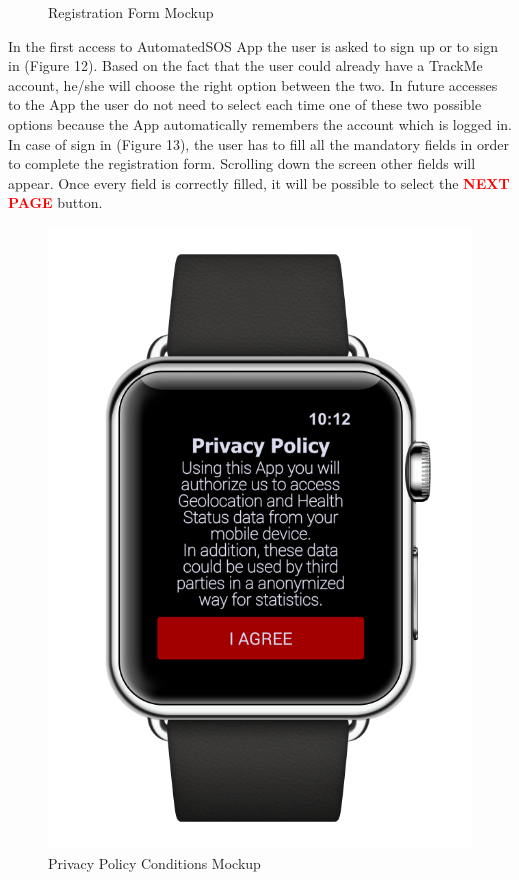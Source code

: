 \begin{enumerate}
\begin{figure}[H]
\begin{center}
\begin{minipage}[c]{.40\textwidth}
          	\caption{Registration Form Mockup}
        \end{minipage}
      \end{center}
\end{figure}
In the first access to AutomatedSOS App the user is asked to sign up or to sign in 			(Figure 12). Based on the fact that the user could already have a TrackMe account, he/she will choose the right option between the two. In future accesses to the App the user do not need to select each time one of these two possible options because the App automatically remembers the account which is logged in. In case of sign in (Figure 13), the user has to fill all the mandatory fields in order to complete the registration form. Scrolling down the screen other fields will appear. Once every field is correctly filled, it will be possible to select the {\textcolor{Red}{\textbf{NEXT PAGE}}} button. 
\clearpage
\begin{figure}[H]
\begin{center}
        \begin{minipage}[c]{.40\textwidth}
        \centering
          \includegraphics[height=12 cm]{Images/Mockups/AutomatedSOSMockup2.png}
             	\caption{Privacy Policy Conditions Mockup}
        \end{minipage}%
        \hspace{10mm}%
        \begin{minipage}[c]{.40\textwidth}
        \centering

\end{minipage}
\end{center}
\end{figure}
\end{enumerate}
